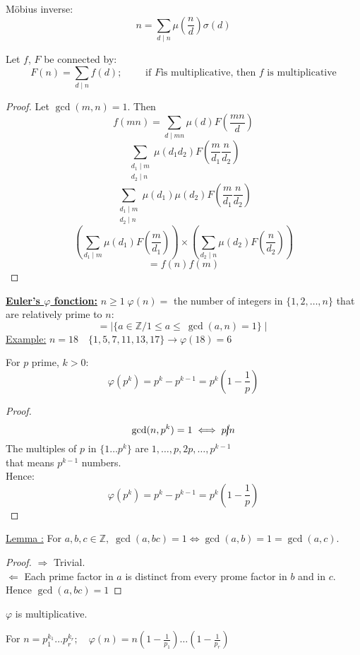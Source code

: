 \documentclass{report}
\begin{document}
M\"{o}bius inverse: \[ n= \sum_{d \mid n} \mu(\frac{n}{d}) \sigma(d)\]
\begin{thm}
				Let $f$, $F$ be connected by:
					\[F(n)=\sum_{d \mid n} f(d) ;\qquad \text{ if }F\text{is multiplicative, then }f\text{ is multiplicative}\]
\end{thm}
\begin{proof}
		Let $\gcd(m,n)=1$. Then 
													\[ f(mn)=\sum_{d \mid mn} \mu(d) F(\frac{mn}{d})\]
													\[\sum_{\substack{d_1 \mid m \\ d_2 \mid n}} \mu(d_1 d_2) F(\frac{m}{d_1} \frac{n}{d_2})\]
													\[\sum_{\substack{d_1 \mid m \\d_2 \mid n}} \mu(d_1) \mu(d_2) F(\frac{m}{d_1} \frac{n}{d_2})\]
													\[(\sum_{d_1 \mid m} \mu(d_1) F(\frac{m}{d_1})) \times (\sum_{d_2 \mid n} \mu(d_2) F(\frac{n}{d_2}))\]
													\[=f(n)f(m)\]
\end{proof}
\textbf{\underline{Euler's $\varphi$ fonction:}} $n\geq 1 \; \varphi(n)=$ the number of integers in $\{1,2,\dots,n\}$ that are relatively prime to $n$:
													\[=\mid \{ a \in \mathbb{Z}/ 1 \leq a \leq \: \gcd(a,n)=1 \} \mid \]
\underline{Example:} $n= 18 \quad \{1,5,7,11,13,17\} \rightarrow \varphi(18)=6$\\
\begin{thm}
				For $p$ prime, $k>0$:
															\[\varphi(p^k)=p^k-p^{k-1}=p^k(1-\frac{1}{p})\]
\end{thm}
\begin{proof}
				\[\gcd(n,p^k)=1 \iff p \cancel{\mid} n\]
				The multiples of $p$ in $\{1 \dots p^k\}$ are $1,\dots, p, 2p, \dots,p^{k-1}$\\
				that means $p^{k-1}$ numbers.\\
				Hence: \[\varphi(p^k) =p^k-p^{k-1}=p^k(1-\frac{1}{p})\]
\end{proof}
\underline{Lemma :} For $a,b,c \in \mathbb{Z},\; \gcd(a,bc)=1 \iff \gcd(a,b)=1=\gcd(a,c)$.
\begin{proof}
		\underline{$\Rightarrow$} Trivial.\\
		\underline{$\Leftarrow$} Each prime factor in $a$ is distinct from every prome factor in $b$ and in $c$. Hence $\gcd(a,bc)=1$
\end{proof}
\begin{thm} $\varphi$ is multiplicative.
\end{thm}
\begin{thm}
				For $n=p_1^{k_1}\dots p_r^{k_r} ;\quad \varphi(n)=n(1-\frac{1}{p_1})\dots(1-\frac{1}{p_r})$
\end{thm}
\end{document}
